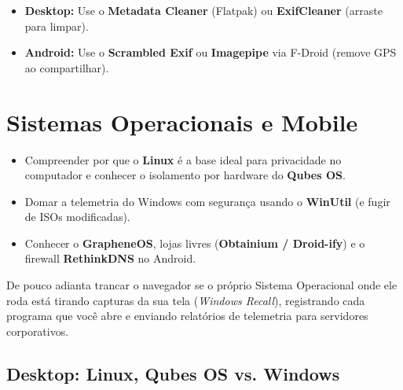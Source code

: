 \documentclass{pousadaguide}
\begin{document}
\begin{dica}
\begin{itemize}
  \item \textbf{Desktop:} Use o \textbf{Metadata Cleaner} (Flatpak) ou \textbf{ExifCleaner} (arraste para limpar).
  \item \textbf{Android:} Use o \textbf{Scrambled Exif} ou \textbf{Imagepipe} via F-Droid (remove GPS ao compartilhar).
\end{itemize}
\end{dica}

\chapter{Sistemas Operacionais e Mobile}

\begin{missao}
\begin{itemize}
  \item Compreender por que o \textbf{Linux} é a base ideal para privacidade no computador e conhecer o isolamento por hardware do \textbf{Qubes OS}.
  \item Domar a telemetria do Windows com segurança usando o \textbf{WinUtil} (e fugir de ISOs modificadas).
  \item Conhecer o \textbf{GrapheneOS}, lojas livres (\textbf{Obtainium / Droid-ify}) e o firewall \textbf{RethinkDNS} no Android.
\end{itemize}
\end{missao}

De pouco adianta trancar o navegador se o próprio Sistema Operacional onde ele roda está tirando capturas da sua tela (\emph{Windows Recall}), registrando cada programa que você abre e enviando relatórios de telemetria para servidores corporativos.

\clearpage
\section{Desktop: Linux, Qubes OS vs. Windows}
\end{document}
